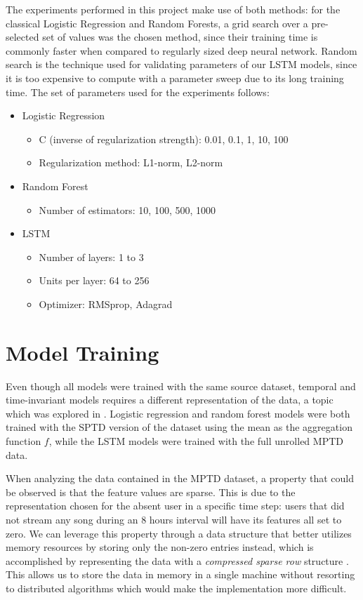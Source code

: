 \documentclass{kththesis}
\begin{document}
The experiments performed in this project make use of both methods: for the classical Logistic Regression and Random Forests, a grid search over a pre-selected set of values was the chosen method, since their training time is commonly faster when compared to regularly sized deep neural network. Random search is the technique used for validating parameters of our LSTM models, since it is too expensive to compute with a parameter sweep due to its long training time. The set of parameters used for the experiments follows:

\begin{itemize}
\item Logistic Regression
\begin{itemize}
\item C (inverse of regularization strength): 0.01, 0.1, 1, 10, 100
\item Regularization method: L1-norm, L2-norm
\end{itemize}
\item Random Forest
\begin{itemize}
\item Number of estimators: 10, 100, 500, 1000
\end{itemize}
\item LSTM
\begin{itemize}
\item Number of layers: 1 to 3
\item Units per layer: 64 to 256
\item Optimizer: RMSprop, Adagrad
\end{itemize}
\end{itemize}

\section{Model Training}

Even though all models were trained with the same source dataset, temporal and time-invariant models requires a different representation of the data, a topic which was explored in . Logistic regression and random forest models were both trained with the SPTD version of the dataset using the mean as the aggregation function $f$, while the LSTM models were trained with the full unrolled MPTD data.

When analyzing the data contained in the MPTD dataset, a property that could be observed is that the feature values are sparse. This is due to the representation chosen for the absent user in a specific time step: users that did not stream any song during an 8 hours interval will have its features all set to zero. We can leverage this property through a data structure that better utilizes memory resources by storing only the non-zero entries instead, which is accomplished by representing the data with a \emph{compressed sparse row} structure \citep{bulucc2009parallel}. This allows us to store the data in memory in a single machine without resorting to distributed algorithms which would make the implementation more difficult.
\end{document}
